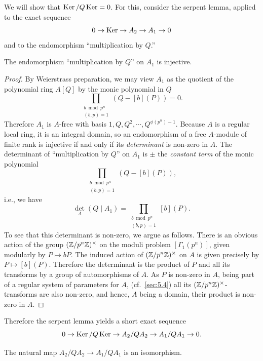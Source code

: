 \begin{pitem}\label{km:6.3.3}
We will show that $\operatorname{Ker}/Q\operatorname{Ker} = 0$. For this, consider the serpent lemma, applied to the exact sequence
\[
0 \to \operatorname{Ker} \to A_2 \to A_1 \to 0
\]
and to the endomorphism ``multiplication by $Q$.''
\end{pitem}

\begin{klem}\label{lem:6.3.4}
The endomorphism ``multiplication by $Q$'' on $A_1$ is injective.
\end{klem}

\begin{proof}
By Weierstrass preparation, we may view $A_1$ as the quotient of the polynomial ring $A[Q]$ by the monic polynomial in $Q$
\[
\prod_{\substack{b \bmod p^n \\ (b,p)=1}} (Q - [b](P)) = 0.
\]
Therefore $A_1$ is $A$-free with basis $1, Q, Q^2, \cdots, Q^{\phi(p^n)-1}$. Because $A$ is a regular local ring, it is an integral domain, so an endomorphism of a free $A$-module of finite rank is injective if and only if its \emph{determinant} is non-zero in $A$. The determinant of ``multiplication by $Q$'' on $A_1$ is $\pm$ the \emph{constant term} of the monic polynomial
\[
\prod_{\substack{b \bmod p^n \\ (b,p)=1}} (Q - [b](P)),
\]
i.e., we have
\[
\det_A(Q \mid A_1) = \prod_{\substack{b \bmod p^n \\ (b,p)=1}} [b](P).
\]
To see that this determinant is non-zero, we argue as follows. There is an obvious action of the group $(\mathbb{Z}/p^n\mathbb{Z})^\times$ on the moduli problem $[\Gamma_1(p^n)]$, given modularly by $P \mapsto bP$. The induced action of $(\mathbb{Z}/p^n\mathbb{Z})^\times$ on $A$ is given precisely by $P \mapsto [b](P)$. Therefore the determinant is the product of $P$ and all its transforms by a group of automorphisms of $A$. As $P$ is non-zero in $A$, being part of a regular system of parameters for $A$, (cf.\ \ref{sec:5.4}) all its $(\mathbb{Z}/p^n\mathbb{Z})^\times$-transforms are also non-zero, and hence, $A$ being a domain, their product is non-zero in $A$.
\end{proof}

Therefore the serpent lemma yields a short exact sequence
\[
0 \to \operatorname{Ker}/Q\operatorname{Ker} \to A_2/QA_2 \to A_1/QA_1 \to 0.
\]

\begin{klem}\label{lem:6.3.5}
The natural map $A_2/QA_2 \to A_1/QA_1$ is an isomorphism.
\end{klem}

